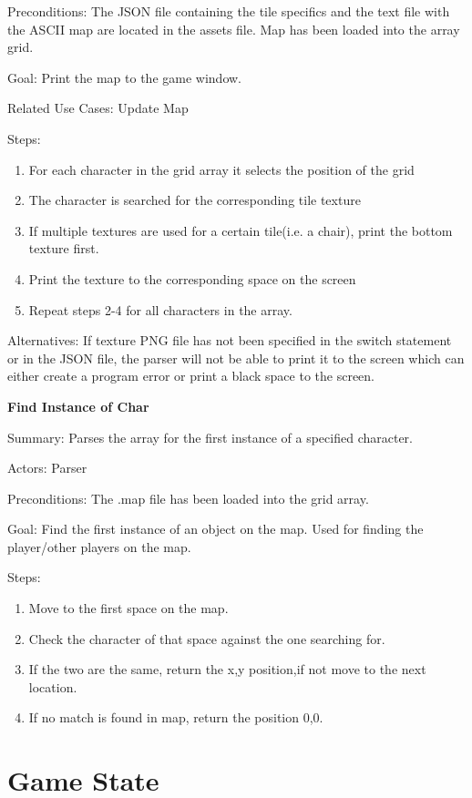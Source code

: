 \documentclass[12pt]{report}
\begin{document}
Preconditions: The JSON file containing the tile specifics and the text file with the ASCII map are located in the assets file. Map has been loaded into the array grid.

Goal: Print the map to the game window.

Related Use Cases: Update Map

Steps:
\begin{enumerate}
	\item For each character in the grid array it selects the position of the grid
	\item The character is searched for the corresponding tile texture
	\item If multiple textures are used for a certain tile(i.e. a chair), print the bottom texture first.
	\item Print the texture to the corresponding space on the screen
	\item Repeat steps 2-4 for all characters in the array.
\end{enumerate}

Alternatives: If texture PNG file has not been specified in the switch statement or in the JSON file, the parser will not be able to print it to the screen which can either create a program error or print a black space to the screen.

\textbf{Find Instance of Char}

Summary: Parses the array for the first instance of a specified character.

Actors: Parser

Preconditions: The .map file has been loaded into the grid array.

Goal: Find the first instance of an object on the map. Used for finding the player/other players on the map.

Steps:
\begin{enumerate}
	\item Move to the first space on the map.
	\item Check the character of that space against the one searching for.
	\item If the two are the same, return the x,y position,if not move to the next location.
	\item If no match is found in map, return the position 0,0.
\end{enumerate}

\section{Game State}
\end{document}
